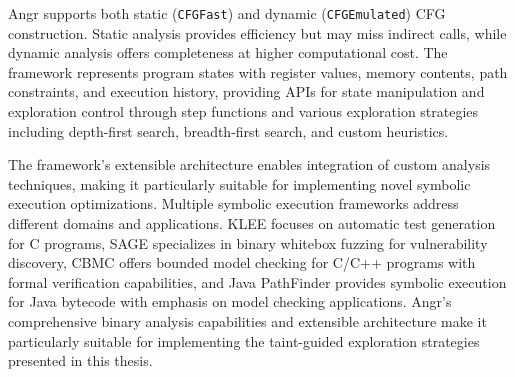 Angr supports both static (\texttt{CFGFast}) and dynamic (\texttt{CFGEmulated}) CFG construction. Static analysis provides efficiency but may miss indirect calls, while dynamic analysis offers completeness at higher computational cost. The framework represents program states with register values, memory contents, path constraints, and execution history, providing APIs for state manipulation and exploration control through step functions and various exploration strategies including depth-first search, breadth-first search, and custom heuristics.

The framework's extensible architecture enables integration of custom analysis techniques, making it particularly suitable for implementing novel symbolic execution optimizations. Multiple symbolic execution frameworks address different domains and applications. KLEE \cite{cadar_klee_2008} focuses on automatic test generation for C programs, SAGE \cite{godefroid_automated_2008} specializes in binary whitebox fuzzing for vulnerability discovery, CBMC \cite{clarke_behavioral_2003} offers bounded model checking for C/C++ programs with formal verification capabilities, and Java PathFinder \cite{visser_model_2003} provides symbolic execution for Java bytecode with emphasis on model checking applications. Angr's comprehensive binary analysis capabilities and extensible architecture make it particularly suitable for implementing the taint-guided exploration strategies presented in this thesis.

